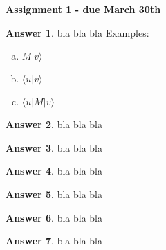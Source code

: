 \documentclass[12pt]{article}
\newcommand{\ket}[1]{|#1\rangle}
\newcommand{\bra}[1]{\langle#1|}
\newcommand{\braket}[2]{\langle  #1 |#2 \rangle}
\theoremstyle{plain}
\theoremstyle{definition}
\newtheorem{ans}{Answer}
\begin{document}
\begin{center}
\Large \textbf{{Assignment 1 - due March 30th}}
\end{center} 


\begin{ans}
 bla bla bla
 Examples:
 \begin{enumerate}[(a)]
 	\item $M \ket v$ 
 	\item $\braket{u}{v}$
 	\item $\bra u M \ket v$
 \end{enumerate}
 
\end{ans}

\noindent \hrulefill

\begin{ans}
 bla bla bla
\end{ans}

\noindent \hrulefill

\begin{ans}
 bla bla bla
\end{ans}

\noindent \hrulefill

\begin{ans}
 bla bla bla
\end{ans}

\noindent \hrulefill

\begin{ans}
 bla bla bla
\end{ans}

\noindent \hrulefill

\begin{ans}
 bla bla bla
\end{ans}

\noindent \hrulefill

\begin{ans}
 bla bla bla
\end{ans}
\end{document}
